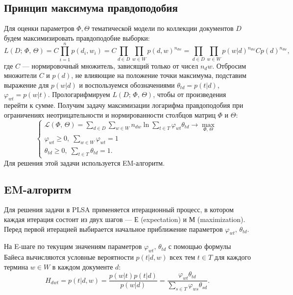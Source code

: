 \documentclass[article, 10pt]{disser}
\begin{document}
\subsection{Принцип максимума правдоподобия}
Для оценки параметров $\Phi, \Theta$ тематической модели по коллекции документов $D$ будем максимизировать правдоподобие выборки:
\begin{equation*}
    L(D;\,\Phi,\,\Theta) = C \prod\limits_{i=1}^{n}p(d_i, w_i) = C \prod\limits_{d \in D}\prod\limits_{w \in W}p(d, w)^{n_{dw}} = \prod\limits_{d \in D}\prod\limits_{w \in W}p(w|d)^{n_{dw}}Cp(d)^{n_{dw}},
\end{equation*}
где $C$ --- нормировочный множитель, зависящий только от чисел $n_dw$. Отбросим множители $C$ и $p(d)$, не влияющие на положение точки максимума, подставим выражение для $p(w|d)$ и воспользуемся обозначениями $\theta_{td} = p(t| d)$, $\varphi_{wt} = p(w |t)$. Прологарифмируем $L(D;\, \Phi,\, \Theta)$, чтобы от произведения перейти к сумме. Получим задачу максимизации логарифма правдоподобия при ограничениях неотрицательности и нормированности столбцов матриц $\Phi$ и $\Theta$:
\begin{equation*}
\begin{cases}
   \mathcal{L}(\Phi,\,\Theta) = \sum\limits_{d \in D}\sum\limits_{w \in W}n_{dw}\ln \sum\limits_{t \in T}\varphi_{wt}\theta_{td} \rightarrow \max\limits_{\Phi,\,\Theta}\\
   \varphi_{wt} \geq 0,\;\sum\limits_{w\in W}\varphi_{wt} = 1\\
   \theta_{td}\geq 0,\; \sum\limits_{t\in T}\theta_{td} = 1.
\end{cases}
\end{equation*}
Для решения этой задачи используется EM-алгоритм.

\subsection{EM-алгоритм}
Для решения задачи в PLSA применяется итерационный процесс, в котором каждая итерация состоит из двух шагов --- Е (expectation) и М (maximization). Перед первой итерацией выбирается начальное приближение параметров $\varphi_{wt},\, \theta_{td}$.

На E-шаге по текущим значениям параметров $\varphi_{wt},\, \theta_{td}$ с помощью формулы Байеса вычисляются условные вероятности $p(t| d, w)$ всех тем $t \in T$ для каждого термина $w \in W$ в каждом документе $d$:
\begin{equation*}
   H_{dwt} = p(t| d, w) = \frac{p(w |t)p(t| d)}{p(w | d)} = \frac{\varphi_{wt}\theta_{td}}{\sum\limits_{s\in T}\varphi_{ws}\theta_{sd}}. 
\end{equation*}
\end{document}
